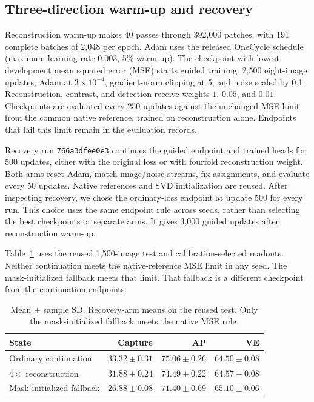 \subsection{Three-direction warm-up and recovery}\label{app:recoveryhistory}
Reconstruction warm-up makes 40 passes through 392,000 patches, with 191
complete batches of 2,048 per epoch. Adam uses the released OneCycle schedule
(maximum learning rate 0.003, 5\% warm-up). The checkpoint with lowest
development mean squared error (MSE) starts guided training: 2,500 eight-image
updates, Adam at $3\times10^{-4}$, gradient-norm clipping at 5, and noise
scaled by 0.1. Reconstruction, contrast, and detection receive weights
$1$, $0.05$, and $0.01$. Checkpoints are evaluated every 250 updates against
the unchanged MSE limit from the common native reference, trained on
reconstruction alone. Endpoints that fail this limit remain in the evaluation records.

Recovery run \texttt{766a3dfee0e3} continues the guided endpoint and trained
heads for 500 updates, either with the original loss or with fourfold
reconstruction weight. Both arms reset Adam, match image/noise streams,
fix assignments, and evaluate every 50 updates. Native references and SVD
initialization are reused. After inspecting recovery, we chose the ordinary-loss
endpoint at update 500 for every run. This choice uses the
same endpoint rule across seeds, rather than selecting the best checkpoints
or separate arms. It gives 3,000 guided updates after reconstruction warm-up.

Table~\ref{tab:recovery-arms} uses the reused 1,500-image test and calibration-selected
readouts. Neither continuation meets the native-reference MSE limit in any
seed. The mask-initialized fallback meets that limit. That fallback
is a different checkpoint from the continuation endpoints.
\begin{table}[t]\centering\small
\caption{Mean $\pm$ sample SD. Recovery-arm means on the reused test. Only the mask-initialized fallback meets the native MSE rule.}\label{tab:recovery-arms}
\begin{tabular}{@{}lrrr@{}}\toprule
State & Capture & AP & VE\\\midrule
Ordinary continuation & $33.32\pm0.31$ & $75.06\pm0.26$ & $64.50\pm0.08$\\
$4\times$ reconstruction & $31.88\pm0.24$ & $74.49\pm0.22$ & $64.57\pm0.08$\\
Mask-initialized fallback & $26.88\pm0.08$ & $71.40\pm0.69$ & $65.10\pm0.06$\\
\bottomrule\end{tabular}

\end{table}

